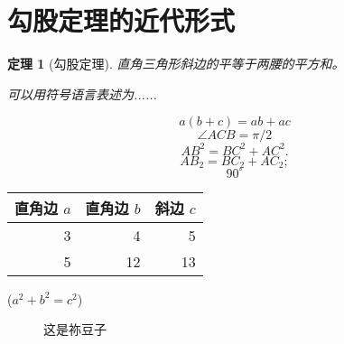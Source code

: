 \documentclass[UTF8]{ctexart} %
\newtheorem{thm}{定理}
\begin{document}
    \section{勾股定理的近代形式}
    \begin{thm}[勾股定理]
        直角三角形斜边的平等于两腰的平方和。

        可以用符号语言表述为......
    \end{thm}
    \begin{equation}
        a(b+c) = ab + ac
    \end{equation}
    \begin{equation}
        \angle ACB = \pi / 2
    \end{equation}
    \begin{equation}
        AB^2 = BC^2 + AC^2.
    \end{equation}
    \begin{equation}
        AB_2 = BC_2 + AC_2;
    \end{equation}
    \begin{equation}
        90^\circ
    \end{equation}
    \begin{table}[H]
        \begin{tabular}{|rrr|}
            \hline
            直角边 $a$ & 直角边 $b$ & 斜边 $c$ \\
            \hline
                3 & 4 & 5 \\
                5 & 12 & 13 \\
            \hline
        \end{tabular}
        \qquad
        ($a^2 + b^2 = c^2$)
    \end{table}
    \begin{figure}[ht]
        \centering
        \caption{这是祢豆子}
        \label{fig::p1}
    \end{figure}
    
\end{document}
